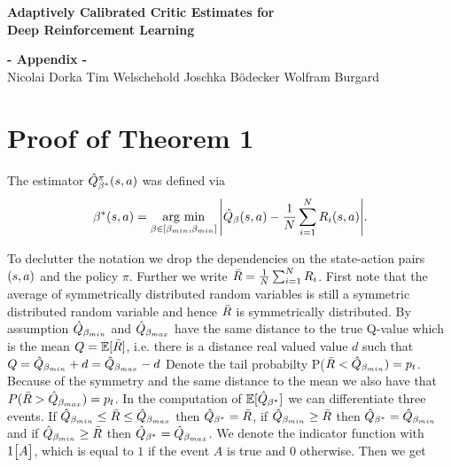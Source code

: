 





\clearpage


\begin{strip}
\begin{center}
\vspace{-5ex}
\textbf{\LARGE \bf
Adaptively Calibrated Critic Estimates for \\ Deep Reinforcement Learning} \\
\vspace{2ex}

\Large{\bf- Appendix -}\\
\vspace{0.4cm}
\normalsize{Nicolai Dorka\hspace{1cm} Tim Welschehold \hspace{1cm} Joschka Bödecker\hspace{1cm} Wolfram Burgard}\\
\end{center}
\end{strip}

\setcounter{section}{0}
\renewcommand{\thesection}{A.\arabic{section}}
\makeatletter

\section{Proof of Theorem 1}

The estimator  $\hat{Q}^{\pi}_{\beta^*}(s, a)$ was defined via
\begin{equation}
    \beta^* (s, a) = \operatorname*{\arg\,min}_{\beta \in [\beta_{min}, \beta_{min}]} \Bigg| \hat{Q}_\beta (s, a) - \frac{1}{N} \sum_{i=1}^{N} R_i (s, a)  \Bigg| .
\end{equation}

To declutter the notation we drop the dependencies on the state-action pairs $(s, a)$ and the policy $\pi$.
Further we write $\Bar{R} = \frac{1}{N} \sum_{i=1}^{N} R_i $.
First note that the average of symmetrically distributed random variables is still a symmetric distributed random variable and hence 
$\Bar{R} $ is symmetrically distributed.
By assumption $\hat{Q}_{\beta_{min}}$ and $\hat{Q}_{\beta_{max}}$ have the same  distance to the true Q-value which is the mean $Q=\operatorname*{\mathbb{E}}[\Bar{R}] $, i.e. there is a distance real valued value $d$ such that
$Q = \hat{Q}_{\beta_{min}} +d = \hat{Q}_{\beta_{max}} -d$
Denote the tail probabilty  P($\Bar{R} < \hat{Q}_{\beta_{min}}) = p_t$.  Because of the symmetry and the same distance to the mean we also have that  $P(\Bar{R} > \hat{Q}_{\beta_{max}}) = p_t$.
In the computation of $\operatorname*{\mathbb{E}} [ \hat{Q}_{\beta^*} ]$  we can differentiate three events.
If $\hat{Q}_{\beta_{min}} \leq \Bar{R} \leq \hat{Q}_{\beta_{max}}$ then $\hat{Q}_{\beta^*} =\Bar{R}$, 
if $\hat{Q}_{\beta_{min}} \geq \Bar{R}$ then $\hat{Q}_{\beta^*} =\hat{Q}_{\beta_{min}}$
and if $\hat{Q}_{\beta_{min}} \geq \Bar{R}$ then $\hat{Q}_{\beta^*} =\hat{Q}_{\beta_{max}}$.
We denote the indicator function with $1\big[A\big]$, which is equal to $1$ if the event $A$ is true and $0$ otherwise.
Then we get

